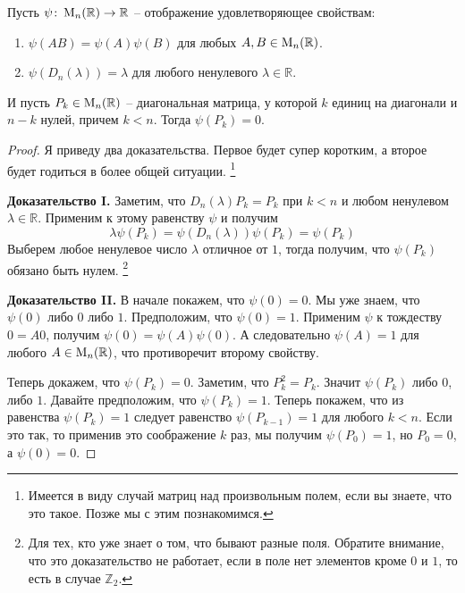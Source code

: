 \begin{claim}
\label{claim::MultiOnIdempotent}
Пусть $\psi\colon \operatorname{M}_{n}(\mathbb R)\to \mathbb R$ -- отображение удовлетворяющее свойствам:
\begin{enumerate}
\item $\psi(AB) = \psi(A)\psi(B)$ для любых $A,B\in\operatorname{M}_{n}(\mathbb R)$.

\item $\psi(D_n(\lambda)) = \lambda$ для любого ненулевого $\lambda\in\mathbb R$.
\end{enumerate}
И пусть $P_k\in\operatorname{M}_{n}(\mathbb R)$ -- диагональная матрица, у которой $k$ единиц на диагонали и $n-k$ нулей, причем $k< n$.
Тогда $\psi(P_k) = 0$.
\end{claim}
\begin{proof}
Я приведу два доказательства.
Первое будет супер коротким, а второе будет годиться в более общей ситуации.%
\footnote{Имеется в виду случай матриц над произвольным полем, если вы знаете, что это такое.
Позже мы с этим познакомимся.}

\noindent\textbf{Доказательство I.} Заметим, что $D_n(\lambda) P_k = P_k$ при $k < n$ и любом ненулевом $\lambda \in \mathbb R$.
Применим к этому равенству $\psi$ и получим
\[
\lambda \psi(P_k) = \psi(D_n(\lambda)) \psi(P_k) = \psi(P_k)
\]
Выберем любое ненулевое число $\lambda$ отличное от $1$, тогда получим, что $\psi(P_k)$ обязано быть нулем.%
\footnote{Для тех, кто уже знает о том, что бывают разные поля.
Обратите внимание, что это доказательство не работает, если в поле нет элементов кроме $0$ и $1$, то есть в случае $\mathbb Z_2$.}


\noindent\textbf{Доказательство II.} В начале покажем, что $\psi(0) = 0$.
Мы уже знаем, что $\psi(0)$ либо $0$ либо $1$.
Предположим, что $\psi(0)=1$.
Применим $\psi$ к тождеству $0 = A 0$, получим $\psi(0) = \psi(A)\psi(0)$.
А следовательно $\psi(A) = 1$ для любого $A\in\operatorname{M}_{n}(\mathbb R)$, что противоречит второму свойству.

Теперь докажем, что $\psi(P_k) = 0$.
Заметим, что $P_k^2 = P_k$.
Значит $\psi(P_k)$ либо $0$, либо $1$.
Давайте предположим, что $\psi(P_k) = 1$.
Теперь покажем, что из равенства $\psi(P_k) = 1$ следует равенство $\psi(P_{k-1}) = 1$ для любого $k < n$.
Если это так, то применив это соображение $k$ раз, мы получим $\psi(P_0) = 1$, но $P_0 = 0$, а $\psi(0) = 0$.


\end{proof}
